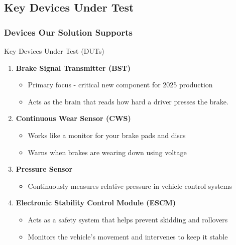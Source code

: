 \documentclass[8pt,compress,aspectratio=169]{beamer}
\newcommand\DarkBold[1]{\textcolor{VSBlueDark}{\textbf{#1}}}
\begin{document}
\subsection{Key Devices Under Test}
\begin{frame}
    \frametitle{Devices Our Solution Supports}
    \begin{block}{Key Devices Under Test (DUTs)}
    \begin{enumerate}
        \item {\DarkBold{Brake Signal Transmitter (BST)}}
        \begin{itemize}
            \item Primary focus - critical new component for 2025 production
            \item Acts as the brain that reads how hard a driver presses the brake.
        \end{itemize}
        \item {\DarkBold{Continuous Wear Sensor (CWS)}}
        \begin{itemize}
            \item Works like a monitor for your brake pads and discs
            \item Warns when brakes are wearing down using voltage
        \end{itemize}
        \item {\DarkBold{Pressure Sensor}}
        \begin{itemize}
            \item Continuously measures relative pressure in vehicle control systems
        \end{itemize}
        \item {\DarkBold{Electronic Stability Control Module (ESCM)}}
            \begin{itemize}
                \item Acts as a safety system that helps prevent skidding and rollovers
                \item Monitors the vehicle's movement and intervenes to keep it stable
            \end{itemize}
    \end{enumerate}
  \end{block}
\end{frame}
\end{document}
